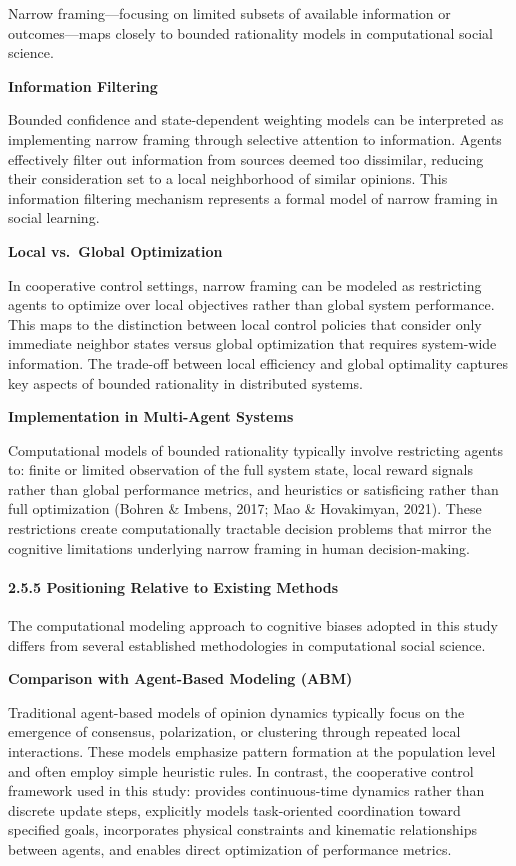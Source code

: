 Narrow framing---focusing on limited subsets of available information or
outcomes---maps closely to bounded rationality models in computational
social science.

\textbf{Information Filtering}

Bounded confidence and state-dependent weighting models can be
interpreted as implementing narrow framing through selective attention
to information. Agents effectively filter out information from sources
deemed too dissimilar, reducing their consideration set to a local
neighborhood of similar opinions. This information filtering mechanism
represents a formal model of narrow framing in social learning.

\textbf{Local vs.~Global Optimization}

In cooperative control settings, narrow framing can be modeled as
restricting agents to optimize over local objectives rather than global
system performance. This maps to the distinction between local control
policies that consider only immediate neighbor states versus global
optimization that requires system-wide information. The trade-off
between local efficiency and global optimality captures key aspects of
bounded rationality in distributed systems.

\textbf{Implementation in Multi-Agent Systems}

Computational models of bounded rationality typically involve
restricting agents to: finite or limited observation of the full system
state, local reward signals rather than global performance metrics, and
heuristics or satisficing rather than full optimization (Bohren \&
Imbens, 2017; Mao \& Hovakimyan, 2021). These restrictions create
computationally tractable decision problems that mirror the cognitive
limitations underlying narrow framing in human decision-making.

\paragraph{2.5.5 Positioning Relative to Existing
Methods}\label{positioning-relative-to-existing-methods}

The computational modeling approach to cognitive biases adopted in this
study differs from several established methodologies in computational
social science.

\textbf{Comparison with Agent-Based Modeling (ABM)}

Traditional agent-based models of opinion dynamics typically focus on
the emergence of consensus, polarization, or clustering through repeated
local interactions. These models emphasize pattern formation at the
population level and often employ simple heuristic rules. In contrast,
the cooperative control framework used in this study: provides
continuous-time dynamics rather than discrete update steps, explicitly
models task-oriented coordination toward specified goals, incorporates
physical constraints and kinematic relationships between agents, and
enables direct optimization of performance metrics.

